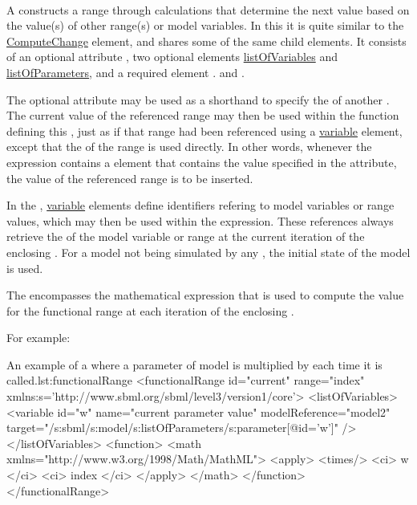 \paragraph{}
\label{class:functionalRange}
A  constructs a range through calculations that determine the next value based on the value(s) of other range(s) or model variables.
In this it is quite similar to the \hyperref[class:computeChange]{ComputeChange} element, and shares some of the same child elements.
It consists of an optional attribute , two optional elements \hyperref[sec:listOfVariables]{listOfVariables} and \hyperref[sec:listOfParameters]{listOfParameters}, and a required element .
and .

The optional attribute  may be used as a shorthand to specify the  of another .
The current value of the referenced range may then be used within the function defining this , just as if that range had been referenced using a \hyperref[class:variable]{variable} element, except that the  of the range is used directly.
In other words, whenever the expression contains a  element that contains the value specified in the  attribute, the value of the referenced range is to be inserted.

In the , \hyperref[class:variable]{variable} elements define identifiers refering to model variables or range values, which may then be used within the  expression.
These references always retrieve the  of the model variable or range at the current iteration of the enclosing .
For a model not being simulated by any , the initial state of the model is used.

The  encompasses the mathematical expression that is used to compute the value for the functional range at each iteration of the enclosing .

For example:

\begin{myXmlLst}{An example of a  where a parameter  of model  is multiplied by  each time it is called.}{lst:functionalRange}
  <functionalRange id="current" range="index"
      xmlns:s='http://www.sbml.org/sbml/level3/version1/core'>
    <listOfVariables>
      <variable id="w" name="current parameter value" modelReference="model2"
          target="/s:sbml/s:model/s:listOfParameters/s:parameter[@id='w']" />
    </listOfVariables>
    <function>
      <math xmlns="http://www.w3.org/1998/Math/MathML">
        <apply>
          <times/>
          <ci> w </ci>
          <ci> index </ci>
        </apply>
      </math>
    </function>
  </functionalRange>
\end{myXmlLst}

